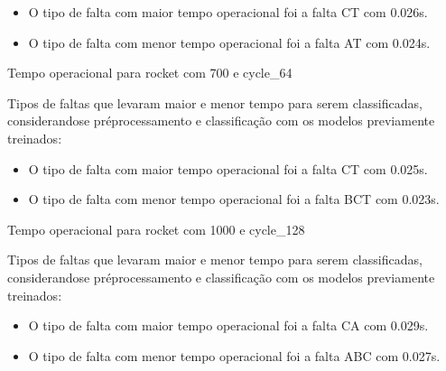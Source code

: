 \begin{itemize}
\item O tipo de falta com maior tempo operacional foi a falta CT com 0.026s.
\item O tipo de falta com menor tempo operacional foi a falta AT com 0.024s.
\end{itemize}
Tempo operacional para rocket com 700 e cycle_64
\item Tipos de faltas que levaram maior e menor tempo para serem classificadas, considerando\hyph se pré\hyph processamento e classificação com os modelos previamente treinados:
\begin{itemize}
\item O tipo de falta com maior tempo operacional foi a falta CT com 0.025s.
\item O tipo de falta com menor tempo operacional foi a falta BCT com 0.023s.
\end{itemize}
Tempo operacional para rocket com 1000 e cycle_128
\item Tipos de faltas que levaram maior e menor tempo para serem classificadas, considerando\hyph se pré\hyph processamento e classificação com os modelos previamente treinados:
\begin{itemize}
\item O tipo de falta com maior tempo operacional foi a falta CA com 0.029s.
\item O tipo de falta com menor tempo operacional foi a falta ABC com 0.027s.
\end{itemize}


